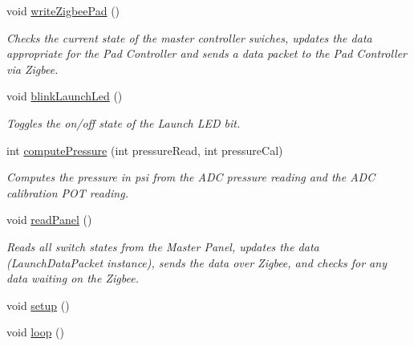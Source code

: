 \begin{DoxyCompactItemize}
void \hyperlink{masterPanel_8ino_a5c5a3e1e876636d4fe4d0fd95c3faa94}{write\+Zigbee\+Pad} ()
\begin{DoxyCompactList}\small\item\em Checks the current state of the master controller swiches, updates the data appropriate for the Pad Controller and sends a data packet to the Pad Controller via Zigbee. \end{DoxyCompactList}\item 
void \hyperlink{masterPanel_8ino_a0e5ef5e02f999a751b31aeb3ec0729b0}{blink\+Launch\+Led} ()
\begin{DoxyCompactList}\small\item\em Toggles the on/off state of the Launch L\+ED bit. \end{DoxyCompactList}\item 
int \hyperlink{masterPanel_8ino_a5a61d5b26e1f6e65e1cf91cde7dc37f6}{compute\+Pressure} (int pressure\+Read, int pressure\+Cal)
\begin{DoxyCompactList}\small\item\em Computes the pressure in psi from the A\+DC pressure reading and the A\+DC calibration P\+OT reading. \end{DoxyCompactList}\item 
void \hyperlink{masterPanel_8ino_a875972e5579573df843bbc6cab825821}{read\+Panel} ()
\begin{DoxyCompactList}\small\item\em Reads all switch states from the Master Panel, updates the data (Launch\+Data\+Packet instance), sends the data over Zigbee, and checks for any data waiting on the Zigbee. \end{DoxyCompactList}\item 
void \hyperlink{masterPanel_8ino_a4fc01d736fe50cf5b977f755b675f11d}{setup} ()
\item 
void \hyperlink{masterPanel_8ino_afe461d27b9c48d5921c00d521181f12f}{loop} ()
\end{DoxyCompactItemize}
